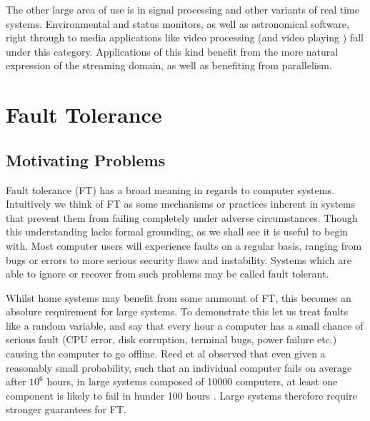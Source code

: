 The other large area of use is in signal processing and other variants of real time systems.
Environmental and status monitors, as well as astronomical software, right through to media applications like video processing (and video playing \cite{thies02}) fall under this category.
Applications of this kind benefit from the more natural expression of the streaming domain, as well as benefiting from parallelism.

\section{Fault Tolerance}
\subsection{Motivating Problems}
Fault tolerance (FT) has a broad meaning in regards to computer systems.
Intuitively we think of FT as some mechanisms or practices inherent in systems that prevent them from failing completely under adverse circumstances.
Though this understanding lacks formal grounding, as we shall see it is useful to begin with.
Most computer users will experience faults on a regular basis, ranging from bugs or errors to more serious security flaws and instability.
Systems which are able to ignore or recover from such problems may be called fault tolerant.

Whilst home systems may benefit from some ammount of FT, this becomes an absolure requirement for large systems.
To demonstrate this let us treat faults like a random variable, and say that every hour a computer has a small chance of serious fault (CPU error, disk corruption, terminal bugs, power failure etc.) causing the computer to go offline.
Reed et al observed that even given a reasonably small probability, such that an individual computer fails on average after $10^6$ hours, in large systems composed of 10000 computers, at least one component is likely to fail in hunder 100 hours \cite{ree06}.
Large systems therefore require stronger guarantees for FT.

